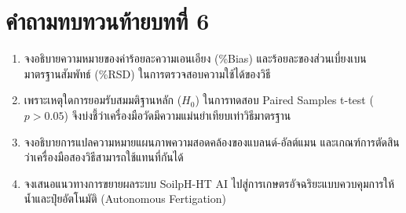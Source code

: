 \section*{คำถามทบทวนท้ายบทที่ 6}

\begin{enumerate}
    \item จงอธิบายความหมายของค่าร้อยละความเอนเอียง (\%Bias) และร้อยละของส่วนเบี่ยงเบนมาตรฐานสัมพัทธ์ (\%RSD) ในการตรวจสอบความใช้ได้ของวิธี
    \item เพราะเหตุใดการยอมรับสมมติฐานหลัก ($H_0$) ในการทดสอบ Paired Samples t-test ($p > 0.05$) จึงบ่งชี้ว่าเครื่องมือวัดมีความแม่นยำเทียบเท่าวิธีมาตรฐาน
    \item จงอธิบายการแปลความหมายแผนภาพความสอดคล้องของแบลนด์-อัลต์แมน และเกณฑ์การตัดสินว่าเครื่องมือสองวิธีสามารถใช้แทนที่กันได้
    \item จงเสนอแนวทางการขยายผลระบบ SoilpH-HT AI ไปสู่การเกษตรอัจฉริยะแบบควบคุมการให้น้ำและปุ๋ยอัตโนมัติ (Autonomous Fertigation)
\end{enumerate}
